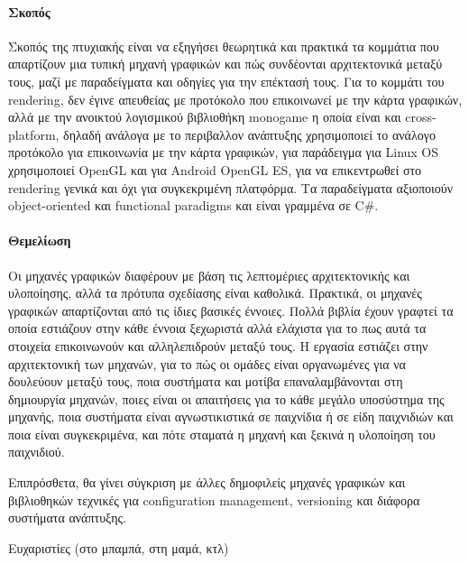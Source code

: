 	\begin{Preface}
	\paragraph{Σκοπός} 
	Σκοπός της πτυχιακής είναι να εξηγήσει θεωρητικά και πρακτικά τα κομμάτια που απαρτίζουν μια
	τυπική μηχανή γραφικών και πώς συνδέονται αρχιτεκτονικά μεταξύ τους, μαζί με παραδείγματα και οδηγίες για την επέκτασή τους. Για το κομμάτι του rendering, δεν  έγινε απευθείας με προτόκολο που επικοινωνεί με την κάρτα γραφικών, αλλά με την ανοικτού λογισμικού βιβλιοθήκη monogame η οποία είναι και cross-platform,  δηλαδή ανάλογα με το περιβαλλον ανάπτυξης χρησιμοποιεί το ανάλογο προτόκολο για επικοινωνία με την κάρτα γραφικών, για παράδειγμα για Linux OS χρησιμοποιεί OpenGL και για Android ΟpenGL ES, για να επικεντρωθεί στο rendering γενικά και όχι για συγκεκριμένη πλατφόρμα. Τα παραδείγματα αξιοποιούν object-oriented και functional paradigms και είναι γραμμένα σε C\#.

	\paragraph{Θεμελίωση} 	
	Οι μηχανές γραφικών διαφέρουν με βάση τις λεπτομέριες αρχιτεκτονικής και υλοποίησης, αλλά τα πρότυπα σχεδίασης είναι καθολικά. Πρακτικά, οι μηχανές γραφικών απαρτίζονται από τις ίδιες βασικές έννοιες. Πολλά βιβλία έχουν γραφτεί τα οποία εστιάζουν στην κάθε έννοια ξεχωριστά αλλά ελάχιστα για το πως αυτά τα στοιχεία επικοινωνούν και αλληλεπιδρούν μεταξύ τους. 
	Η εργασία εστιάζει στην αρχιτεκτονική των μηχανών, 
	για το πώς οι ομάδες είναι οργανωμένες για να δουλεύουν μεταξύ τους, 
	ποια συστήματα και μοτίβα επαναλαμβάνονται στη δημιουργία μηχανών, 
	ποιες είναι οι απαιτήσεις για το κάθε μεγάλο υποσύστημα της μηχανής, 
	ποια συστήματα είναι αγνωστικιστικά σε παιχνίδια ή σε είδη παιχνιδιών και ποια είναι συγκεκριμένα,
	και πότε σταματά η μηχανή και ξεκινά η υλοποίηση του παιχνιδιού.
	
	Eπιπρόσθετα, θα γίνει σύγκριση με άλλες δημοφιλείς μηχανές γραφικών και βιβλιοθηκών τεχνικές για configuration management, versioning και διάφορα συστήματα ανάπτυξης. 
	\end{Preface}
	
	\begin{Acknowledgement}
		Ευχαριστίες (στο μπαμπά, στη μαμά, κτλ)
	\end{Acknowledgement}